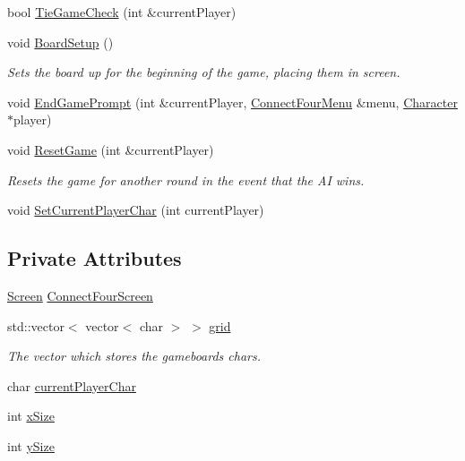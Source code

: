 \begin{DoxyCompactItemize}
bool \hyperlink{classConnectFour_a6f356156a6c23ee1f5838cd96b3b84bc}{Tie\-Game\-Check} (int \&current\-Player)
\item 
void \hyperlink{classConnectFour_ad453f2707d1ae7bb87cdd2d46010d951}{Board\-Setup} ()
\begin{DoxyCompactList}\small\item\em Sets the board up for the beginning of the game, placing them in screen. \end{DoxyCompactList}\item 
void \hyperlink{classConnectFour_a735502158808aaa23f0a2d38ac3f841f}{End\-Game\-Prompt} (int \&current\-Player, \hyperlink{classConnectFourMenu}{Connect\-Four\-Menu} \&menu, \hyperlink{classCharacter}{Character} $\ast$player)
\item 
void \hyperlink{classConnectFour_aaf17855d2cec2d71c07614af530a00bf}{Reset\-Game} (int \&current\-Player)
\begin{DoxyCompactList}\small\item\em Resets the game for another round in the event that the A\-I wins. \end{DoxyCompactList}\item 
void \hyperlink{classConnectFour_a8f74f9d22c247508e868222c27136641}{Set\-Current\-Player\-Char} (int current\-Player)
\end{DoxyCompactItemize}
\subsection*{Private Attributes}
\begin{DoxyCompactItemize}
\item 
\hyperlink{classScreen}{Screen} \hyperlink{classConnectFour_a7548207e4c83260233e8d3668ae3e7e2}{Connect\-Four\-Screen}
\item 
std\-::vector$<$ vector$<$ char $>$ $>$ \hyperlink{classConnectFour_aa394189c6422c3901d18997202fff27e}{grid}
\begin{DoxyCompactList}\small\item\em The vector which stores the gameboards chars. \end{DoxyCompactList}\item 
char \hyperlink{classConnectFour_adc938d715dbe28efc1db3b4a1dc866cb}{current\-Player\-Char}
\item 
int \hyperlink{classConnectFour_a9ebcc46eaaac1805eab8b90925f83a63}{x\-Size}
\item 
int \hyperlink{classConnectFour_acd39fbfa19a81ab05e7aae3ac51e9ed8}{y\-Size}
\end{DoxyCompactItemize}
